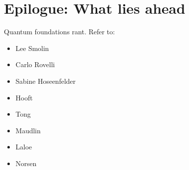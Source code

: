 \chapter{Epilogue: What lies ahead}
Quantum foundations rant. Refer to:
\begin{itemize}
\item Lee Smolin
\item Carlo Rovelli
\item Sabine Hoseenfelder
\item Hooft
\item Tong
\item Maudlin
\item Laloe
\item Norsen
\end{itemize}